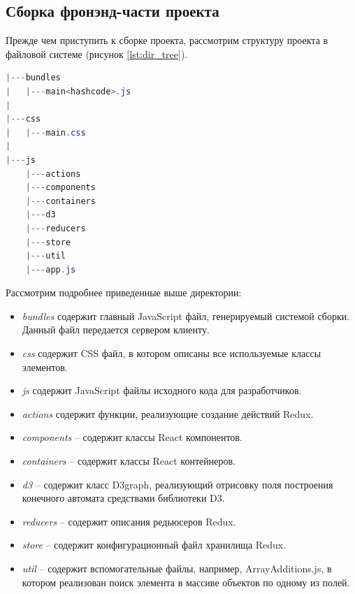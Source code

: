 
\subsection{Сборка фронэнд-части проекта}

Прежде чем приступить к сборке проекта, рассмотрим структуру проекта в файловой системе (рисунок \ref{lst:dir_tree}). 

\begin{lstlisting}[language=Java,
label=lst:dir_tree,
caption={Дерево директорий проекта.}]
|---bundles
|	|---main<hashcode>.js
|
|---css
|	|---main.css
|
|---js
    |---actions
    |---components
    |---containers
    |---d3
    |---reducers
    |---store
    |---util
    |---app.js
\end{lstlisting}

Рассмотрим подробнее приведенные выше директории:

\begin{itemize}
	\item \textit{bundles} содержит главный JavaScript файл, генерируемый системой сборки. Данный файл передается сервером клиенту.
	\item \textit{css} содержит CSS файл, в котором описаны все используемые классы элементов.
	\item \textit{js} содержит JavaScript файлы исходного кода для разработчиков.
	\item \textit{actions} содержит функции, реализующие создание действий Redux.
	\item \textit{components} -- содержит классы React компонентов.
	\item \textit{containers} -- содержит классы React контейнеров.
	\item \textit{d3} -- содержит класс D3graph, реализующий отрисовку поля построения конечного автомата средствами библиотеки D3.
	\item \textit{reducers} -- содержит описания редьюсеров Redux.
	\item \textit{store} -- содержит конфигурационный файл хранилища Redux.
	\item \textit{util} -- содержит вспомогательные файлы, например, ArrayAdditions.js, в котором реализован поиск элемента в массиве объектов по одному из полей.
\end{itemize}

